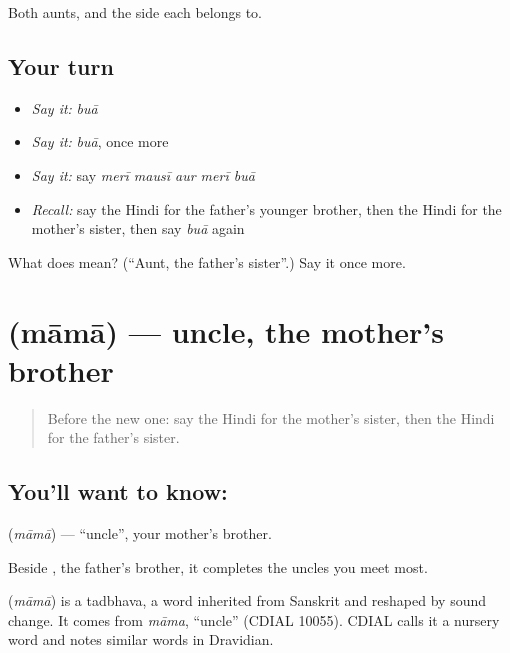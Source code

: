 \begin{grammarlens}[title={What you've built}]
Both aunts, and the side each belongs to.
\end{grammarlens}

\subsection*{Your turn}
\begin{itemize}
\raggedright
  \item \emph{Say it:} \emph{buā}
  \item \emph{Say it:} \emph{buā}, once more
  \item \emph{Say it:} say \emph{merī mausī aur merī buā}
  \item \emph{Recall:} say the Hindi for the father's younger brother, then the Hindi for the mother's sister, then say \emph{buā} again
\end{itemize}

\begin{tcolorbox}[breakable,colback=teal!4,colframe=teal!35!black,title={Before you move on}]
What does  mean? (\textquotedblleft{}Aunt, the father's sister\textquotedblright{}.) Say it once more.
\end{tcolorbox}
\section[\texorpdfstring{\hi{मामा} (māmā)}{मामा (māmā)}]{ (māmā) — uncle, the mother's brother}

\label{lesson:HI-C117-mama}



\begin{quote}
Before the new one: say the Hindi for the mother's sister, then the Hindi for the father's sister.
\end{quote}

\subsection*{You'll want to know: }
\textbf{} (\emph{māmā}) — \textquotedblleft{}uncle\textquotedblright{}, your mother's brother.

Beside \textbf{}, the father's brother, it completes the uncles you meet most.

\begin{cousinweb}
\textbf{} (\emph{māmā}) is a tadbhava, a word inherited from Sanskrit and reshaped by sound change. It comes from \emph{māma}, \textquotedblleft{}uncle\textquotedblright{} (CDIAL 10055). CDIAL calls it a nursery word and notes similar words in Dravidian.
\end{cousinweb}

